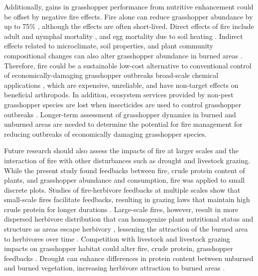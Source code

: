\documentclass[referee, 
	            sn-basic]
           {sn-jnl}
\begin{document}
\begin{linenumbers}
Additionally, gains in grasshopper performance from nutritive enhancement could be offset by negative fire effects. Fire alone can reduce grasshopper abundance by up to 75\% \citep{branson2016}, although the effects are often short-lived. Direct effects of fire include adult and nymphal mortality \citep{bock1991}, and egg mortality due to soil heating \citep{branson2007, branson2013, branson2016, vermeire2004}. Indirect effects related to microclimate, soil properties, and plant community compositional changes can also alter grasshopper abundance in burned areas \citep{vanwingerden1991,schirmel2011, evans1983,matenaar2014, meyer2002}. Therefore, fire could be a sustainable low-cost alternative to conventional control of economically-damaging grasshopper outbreaks \textemdash broad-scale chemical applications \citep{branson2006}, which are expensive, unreliable, and have non-target effects on beneficial arthropods. In addition, ecosystem services provided by non-pest grasshopper species are lost when insecticides are used to control grasshopper outbreaks \citep{joern2000}. Longer-term assessment of grasshopper dynamics in burned and unburned areas are needed to determine the potential for fire management for reducing outbreaks of economically damaging grasshopper species.  

Future research should also assess the impacts of fire at larger scales and the interaction of fire with other disturbances such as drought and livestock grazing. While the present study found feedbacks between fire, crude protein content of plants, and grasshopper abundance and consumption, fire was applied to small discrete plots. Studies of fire-herbivore feedbacks at multiple scales show that small-scale fires facilitate feedbacks, resulting in grazing laws that maintain high crude protein for longer durations \citep{cromsigt2008}. Large-scale fires, however, result in more dispersed herbivore distribution that can homogenize plant nutritional status and structure as areas escape herbivory \citep{archibald2005}, lessening the attraction of the burned area to herbivores over time \citep{donaldson2018}. Competition with livestock and livestock grazing impacts on grasshopper habitat could alter fire, crude protein, grasshopper feedbacks \citep{onsager2000a, oneill2003}. Drought can enhance differences in protein content between unburned and burned vegetation, increasing herbivore attraction to burned areas \citep{augustine2014, yoganand2014}. 



\backmatter



\end{linenumbers}
\end{document}
